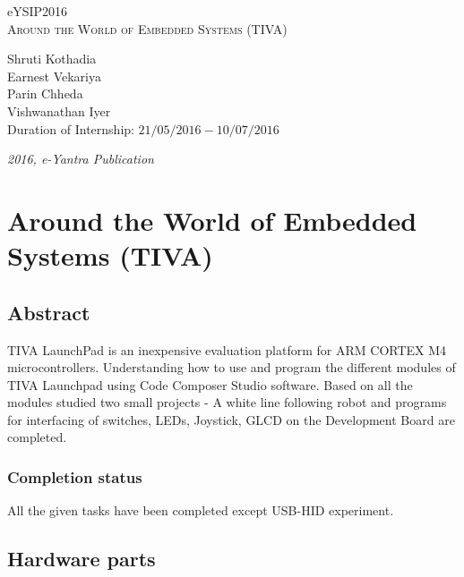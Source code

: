 \documentclass[a4paper,12pt,oneside]{book}
\begin{document}
\begin{titlepage}
\raggedright
{\Large eYSIP2016\\[1cm]}
{\Huge\scshape Around the World of Embedded Systems (TIVA)\\[.1in]}
\vfill
\begin{flushright}
{\large Shruti Kothadia\\}
{\large Earnest Vekariya \\}
{\large Parin Chheda \\}
{\large Vishwanathan Iyer \\}
{\large Duration of Internship: $ 21/05/2016-10/07/2016 $ \\}
\end{flushright}

{\itshape 2016, e-Yantra Publication}
\end{titlepage}

\chapter[Project Tag]{Around the World of Embedded Systems (TIVA)}
\section*{Abstract}
TIVA LaunchPad is an inexpensive evaluation platform for ARM CORTEX M4 microcontrollers. Understanding how to use and program the different modules of TIVA Launchpad using Code Composer Studio software. Based on all the modules studied two small projects - A white line following robot and programs for interfacing of switches, LEDs, Joystick, GLCD on the Development Board are completed. 

\subsection*{Completion status}
All the given tasks have been completed except USB-HID experiment. 

\newpage
\section{Hardware parts}
\end{document}
